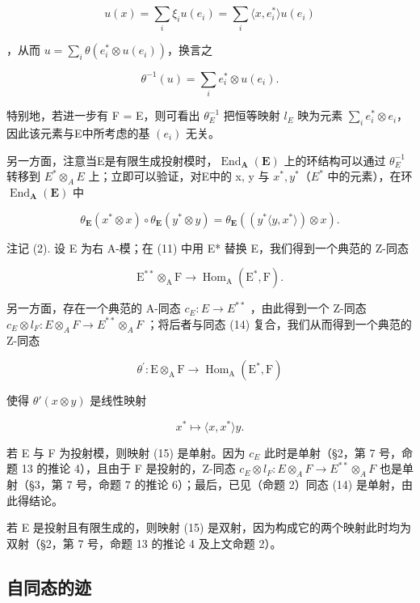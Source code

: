\[
u (x) = \sum_ {i} \xi_ {i} u (e _ {i}) = \sum_ {i} \langle x, e _ {i} ^ {*} \rangle u (e _ {i})
\]

，从而 \(u = \sum_{i} \theta(e_i^* \otimes u(e_i))\)，换言之

\[
\theta^ {- 1} (u) = \sum_ {i} e _ {i} ^ {*} \otimes u (e _ {i}).\tag{12}
\]

特别地，若进一步有 F = E，则可看出 \(\theta_{E}^{-1}\) 把恒等映射 \(l_{E}\) 映为元素 \(\sum_{i} e_{i}^{*} \otimes e_{i}\)，因此该元素与E中所考虑的基 \((e_{i})\) 无关。

另一方面，注意当E是有限生成投射模时，\(\operatorname{End}_{\mathbf{A}}(\mathbf{E})\) 上的环结构可以通过 \(\theta_{E}^{-1}\) 转移到 \(E^{*}\otimes_{A}E\) 上；立即可以验证，对E中的 x, y 与 \(x^{*}, y^{*}\)（\(E^{*}\) 中的元素），在环 \(\operatorname{End}_{\mathbf{A}}(\mathbf{E})\) 中

\[
\theta_ {\mathbf {E}} (x ^ {*} \otimes x) \circ \theta_ {\mathbf {E}} (y ^ {*} \otimes y) = \theta_ {\mathbf {E}} ((y ^ {*} \langle y, x ^ {*} \rangle) \otimes x).\tag{13}
\]

注记 (2). 设 E 为右 A-模；在 (11) 中用 E* 替换 E，我们得到一个典范的 Z-同态

\[
\mathrm{E} ^ {* *} \otimes_ {\mathrm{A}} \mathrm{F} \rightarrow \operatorname{Hom} _ {\mathrm{A}} (\mathrm{E} ^ {*}, \mathrm{F}).\tag{14}
\]

另一方面，存在一个典范的 A-同态 \(c_{E}:E\to E^{**}\) ，由此得到一个 Z-同态 \(c_{E}\otimes l_{F}:E\otimes_{A}F\to E^{**}\otimes_{A}F\) ；将后者与同态 (14) 复合，我们从而得到一个典范的 Z-同态

\[
\theta^ {\prime}: \mathrm{E} \otimes_ {\mathrm{A}} \mathrm{F} \rightarrow \operatorname{Hom} _ {\mathrm{A}} (\mathrm{E} ^ {*}, \mathrm{F})\tag{15}
\]

使得 \(\theta'(x \otimes y)\) 是线性映射

\[
x ^ {*} \mapsto \langle x, x ^ {*} \rangle y.
\]

若 E 与 F 为投射模，则映射 (15) 是单射。因为 \(c_{E}\) 此时是单射（§2，第 7 号，命题 13 的推论 4），且由于 F 是投射的，Z-同态 \(c_{E} \otimes l_{F}: E \otimes_{A} F \to E^{**} \otimes_{A} F\) 也是单射（§3，第 7 号，命题 7 的推论 6）；最后，已见（命题 2）同态 (14) 是单射，由此得结论。

若 E 是投射且有限生成的，则映射 (15) 是双射，因为构成它的两个映射此时均为双射（§2，第 7 号，命题 13 的推论 4 及上文命题 2）。

\subsection{自同态的迹}

